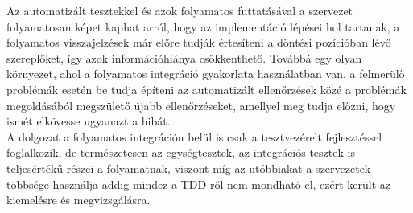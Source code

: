 Az automatizált tesztekkel és azok folyamatos futtatásával a szervezet folyamatosan képet kaphat arról, hogy az implementáció lépései hol tartanak, a folyamatos visszajelzések már előre tudják értesíteni a döntési pozícióban lévő szereplőket, így azok információhiánya csökkenthető. Továbbá egy olyan környezet, ahol a folyamatos integráció gyakorlata használatban van, a felmerülő problémák esetén be tudja építeni az automatizált ellenőrzések közé a problémák megoldásából megszülető újabb ellenőrzéseket, amellyel meg tudja előzni, hogy ismét elkövesse ugyanazt a hibát.
\\
A dolgozat a folyamatos integráción belül is csak a tesztvezérelt fejlesztéssel foglalkozik, de természetesen az egységtesztek, az integrációs tesztek is teljesértékű részei a folyamatnak, viszont míg az utóbbiakat a szervezetek többsége használja addig mindez a TDD-ről nem mondható el, ezért került az kiemelésre és megvizsgálásra.